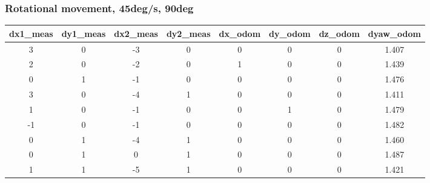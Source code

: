 \documentclass[a4paper, 12pt]{article}
\begin{document}
    \subsubsection{Rotational movement, 45deg/s, 90deg}
    \begin{table}[H]
    \scriptsize
    \begin{tabular}{@{}cccccccc@{}}
    \toprule
    \textbf{dx1\_meas} & \textbf{dy1\_meas} & \textbf{dx2\_meas} & \textbf{dy2\_meas} & \textbf{dx\_odom} & \textbf{dy\_odom} & \textbf{dz\_odom} & \textbf{dyaw\_odom} \\ \midrule
    3                      & 0                      & -3                     & 0                      & 0                 & 0                 & 0                 & 1.407               \\
    2                      & 0                      & -2                     & 0                      & 1                 & 0                 & 0                 & 1.439               \\
    0                      & 1                      & -1                     & 0                      & 0                 & 0                 & 0                 & 1.476               \\
    3                      & 0                      & -4                     & 1                      & 0                 & 0                 & 0                 & 1.411               \\
    1                      & 0                      & -1                     & 0                      & 0                 & 1                 & 0                 & 1.479               \\
    -1                     & 0                      & -1                     & 0                      & 0                 & 0                 & 0                 & 1.482               \\
    0                      & 1                      & -4                     & 1                      & 0                 & 0                 & 0                 & 1.460               \\
    0                      & 1                      & 0                      & 1                      & 0                 & 0                 & 0                 & 1.487               \\
    1                      & 1                      & -5                     & 1                      & 0                 & 0                 & 0                 & 1.421               \\

\end{tabular}
\end{table}
\end{document}

